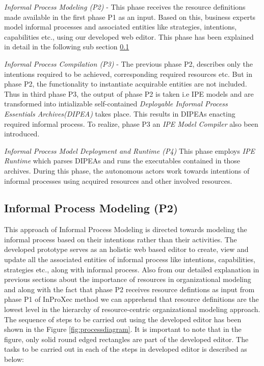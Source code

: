\textit{Informal Process Modeling (P2)} - This phase receives the resource definitions made available in the first phase P1 as an input.  Based on this, business experts model informal processes and associated entities like strategies, intentions, capabilities etc., using our developed web editor. This phase has been explained in detail in the following sub section \ref{subsec:informalprocessmodeling}    

\textit{Informal Process Compilation (P3)} - The previous phase P2, describes only the intentions required to be achieved, corresponding required resources etc. But in phase P2, the functionality to instantiate acquirable entities are not included. Thus in third phase P3, the output of phase P2 is taken i.e IPE models and are transformed into intializable self-contained \textit{Deployable Informal Process Essentials Archives(DIPEA)} \cite{Sungur2015} takes place. This results in DIPEAs enacting required informal process. To realize, phase P3 an \textit{IPE Model Compiler} also been introduced. 

\textit{Informal Process Model Deployment and Runtime (P4)} This phase employs \textit{IPE Runtime} which parses DIPEAs and runs the executables contained in those archives. During this phase, the autonomous actors work towards intentions of informal processes using acquired resources and other involved resources.  

\subsection{Informal Process Modeling (P2)}
\label{subsec:informalprocessmodeling}
This approach of Informal Process Modeling is directed towards modeling the informal process based on their intentions rather than their activities. The developed prototype serves as an holistic web based editor to create, view and update all the associated entities of informal process like intentions, capabilities, strategies etc., along with informal process. Also from our detailed explanation in previous sections about the importance of resources in organizational modeling  and along with the fact that phase P2 receives resource defintions as input from phase P1 of InProXec method we can apprehend that resource definitions are the lowest level in the hierarchy of resource-centric organizational modeling approach. The sequence of steps to be carried out using the developed editor has been shown in the Figure  \ref{fig:processdiagram}. It is important to note that in the figure, only solid round edged rectangles are part of the developed editor. The tasks to be carried out in each of the steps in developed editor is described as below:

